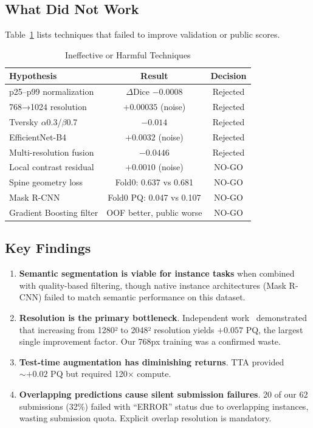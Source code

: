 \documentclass[conference]{IEEEtran}
\begin{document}
\subsection{What Did Not Work}

Table~\ref{tab:ineffective} lists techniques that failed to improve validation or public scores.

\begin{table}[h]
\centering
\caption{Ineffective or Harmful Techniques}
\label{tab:ineffective}
\small
\begin{tabular}{@{}lcc@{}}
\toprule
\textbf{Hypothesis} & \textbf{Result} & \textbf{Decision} \\
\midrule
p25--p99 normalization & $\Delta$Dice $-0.0008$ & Rejected \\
768→1024 resolution & $+0.00035$ (noise) & Rejected \\
Tversky $\alpha$0.3/$\beta$0.7 & $-0.014$ & Rejected \\
EfficientNet-B4 & $+0.0032$ (noise) & Rejected \\
Multi-resolution fusion & $-0.0446$ & Rejected \\
Local contrast residual & $+0.0010$ (noise) & NO-GO \\
Spine geometry loss & Fold0: 0.637 vs 0.681 & NO-GO \\
Mask R-CNN & Fold0 PQ: 0.047 vs 0.107 & NO-GO \\
Gradient Boosting filter & OOF better, public worse & NO-GO \\
\bottomrule
\end{tabular}
\end{table}

\subsection{Key Findings}

\begin{enumerate}
    \item \textbf{Semantic segmentation is viable for instance tasks} when combined with quality-based filtering, though native instance architectures (Mask R-CNN) failed to match semantic performance on this dataset.
    \item \textbf{Resolution is the primary bottleneck}. Independent work~\cite{argoha2026} demonstrated that increasing from 1280² to 2048² resolution yields $+0.057$ PQ, the largest single improvement factor. Our 768px training was a confirmed waste.
    \item \textbf{Test-time augmentation has diminishing returns}. TTA provided $\sim+0.02$ PQ but required 120× compute.
    \item \textbf{Overlapping predictions cause silent submission failures}. 20 of our 62 submissions (32\%) failed with ``ERROR'' status due to overlapping instances, wasting submission quota. Explicit overlap resolution is mandatory.
\end{enumerate}
\end{document}
